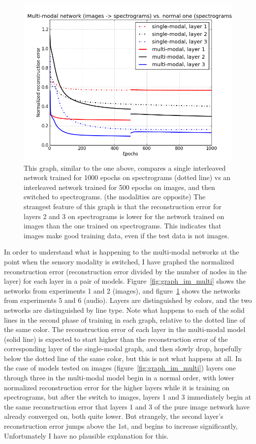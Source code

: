 \documentclass[12pt]{article}
\begin{document}
\begin{doublespacing}
\begin{figure}[p]
\centering
\includegraphics[width=6in]{graph_spect_multi}
\caption{This graph, similar to the one above, compares a single interleaved network trained for 1000 epochs on spectrograms (dotted line) vs an interleaved network trained for 500 epochs on images, and then switched to spectrograms. (the modalities are opposite) The strangest feature of this graph is that the reconstruction error for layers 2 and 3 on spectrograms is lower for the network trained on images than the one trained on spectrograms. This indicates that images make good training data, even if the test data is not images.}
\label{fig:graph_spect_multi}
\end{figure}
	
	In order to understand what is happening to the multi-modal networks at the point when the sensory modality is switched, I have graphed the normalized reconstruction error (reconstruction error divided by the number of nodes in the layer) for each layer in a pair of models. Figure~\ref{fig:graph_im_multi} shows the networks from experiments 1 and 2 (images), and figure~\ref{fig:graph_spect_multi} shows the networks from experiments 5 and 6 (audio). Layers are distinguished by colors, and the two networks are distinguished by line type.  Note what happens to each of the solid lines in the second phase of training in each graph, relative to the dotted line of the same color. The reconstruction error of each layer in the multi-modal model (solid line) is expected to start higher than the reconstruction error of the corresponding layer of the single-modal graph, and then slowly drop, hopefully below the dotted line of the same color, but this is not what happens at all. In the case of models tested on images (figure~\ref{fig:graph_im_multi}) layers one through three in the multi-modal model begin in a normal order, with lower normalized reconstruction error for the higher layers while it is training on spectrograms, but after the switch to images, layers 1 and 3 immediately begin at the same reconstruction error that layers 1 and 3 of the pure image network have already converged on, both quite lower. But strangely, the second layer's reconstruction error jumps above the 1st, and begins to increase significantly, Unfortunately I have no plausible explanation for this. 
	

\end{doublespacing}
\end{document}
